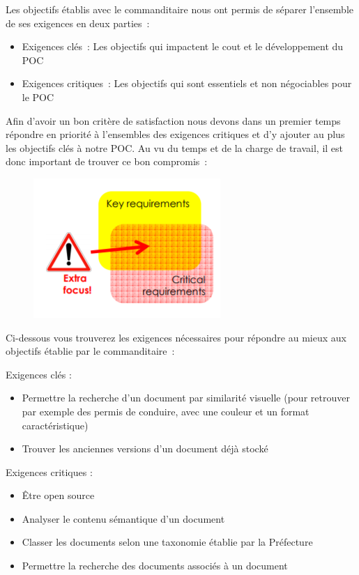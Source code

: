  Les objectifs établis avec le commanditaire nous ont permis de séparer l'ensemble de ses exigences en deux parties :
\begin {itemize}
\item Exigences clés : Les objectifs qui impactent le cout et le développement du POC
\item Exigences critiques : Les objectifs qui sont essentiels et non négociables pour le POC
\end {itemize}

\par
Afin d'avoir un bon critère de satisfaction nous devons dans un premier temps répondre en priorité à l’ensembles des exigences critiques et d’y ajouter au plus les objectifs clés à notre POC. Au vu du temps et de la charge de travail, il est donc important de trouver ce bon compromis : 

\begin{figure}[h!]
	\includegraphics{images/requirements.png}
	\label{fig:MC}
\end{figure}		

	 Ci-dessous vous trouverez les exigences nécessaires pour répondre au mieux aux objectifs établie par le commanditaire :

Exigences clés :
\begin {itemize}
\item Permettre la recherche d’un document par similarité visuelle (pour
retrouver par exemple des permis de conduire, avec une couleur et un
format caractéristique)
\item Trouver les anciennes versions d’un document déjà stocké
\\
\end {itemize}

Exigences critiques :
\begin {itemize}
\item Être open source
\item Analyser le contenu sémantique d’un document
\item Classer les documents selon une taxonomie établie par la Préfecture
\item Permettre la recherche des documents associés à un document
\end {itemize}



